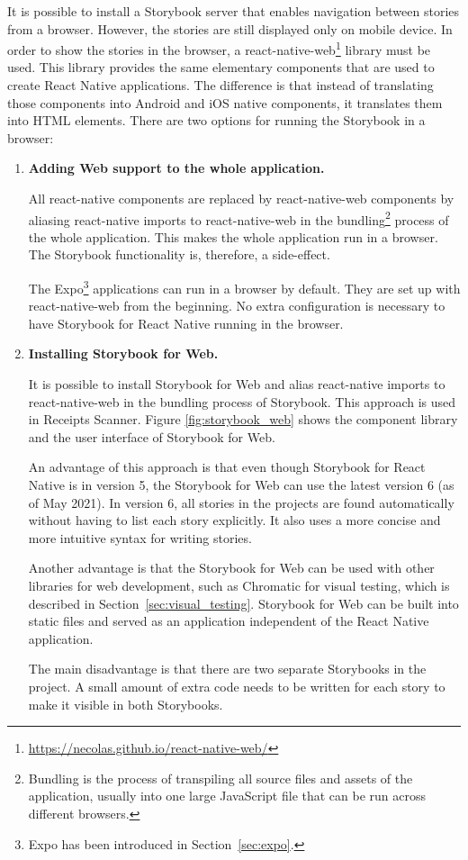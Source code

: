 \documentclass[
  printed, %
  table,   %
  oneside, %
  lof,     %
  lot,     %
]{fithesis3}
\begin{document}
It is possible to install a Storybook server that enables navigation between stories from a browser. However, the stories are still displayed only on mobile device. In order to show the stories in the browser, a react-native-web\footnote{\url{https://necolas.github.io/react-native-web/}} library must be used. This library provides the same elementary components that are used to create React Native applications. The difference is that instead of translating those components into Android and iOS native components, it translates them into HTML elements.
There are two options for running the Storybook in a browser:

\begin{enumerate}
    \item \textbf{Adding Web support to the whole application.}
    
    All react-native components are replaced by react-native-web components by aliasing react-native imports to react-native-web in the bundling\footnote{Bundling is the process of transpiling all source files and assets of the application, usually into one large JavaScript file that can be run across different browsers.} process of the whole application. This makes the whole application run in a browser. The Storybook functionality is, therefore, a side-effect.
    
    The Expo\footnote{Expo has been introduced in Section~\ref{sec:expo}.} applications can run in a browser by default. They are set up with react-native-web from the beginning. No extra configuration is necessary to have Storybook for React Native running in the browser.
    
    \item \textbf{Installing Storybook for Web.} 
    
    It is possible to install Storybook for Web and alias react-native imports to react-native-web in the bundling process of Storybook. This approach is used in Receipts Scanner. Figure \ref{fig:storybook_web} shows the component library and the user interface of Storybook for Web.
    
    An advantage of this approach is that even though Storybook for React Native is in version 5, the Storybook for Web can use the latest version 6 (as of May 2021). In version 6, all stories in the projects are found automatically without having to list each story explicitly. It also uses a more concise and more intuitive syntax for writing stories.
    
    Another advantage is that the Storybook for Web can be used with other libraries for web development, such as Chromatic for visual testing, which is described in Section~\ref{sec:visual_testing}. Storybook for Web can be built into static files and served as an application independent of the React Native application.
    
    The main disadvantage is that there are two separate Storybooks in the project. A small amount of extra code needs to be written for each story to make it visible in both Storybooks. 
    
\end{enumerate}
\end{document}
